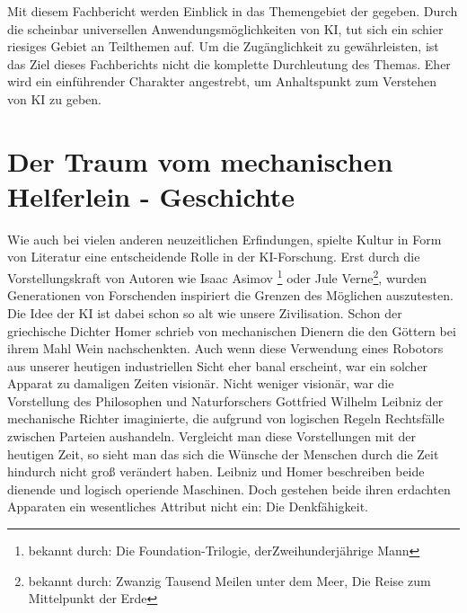 \documentclass[12pt,german,ngerman]{report}
\begin{document}
    Mit diesem Fachbericht werden Einblick in das Themengebiet der  gegeben.
    Durch die scheinbar universellen Anwendungsmöglichkeiten von KI, tut sich ein schier riesiges Gebiet an Teilthemen auf.
    Um die Zugänglichkeit zu gewährleisten, ist das Ziel dieses Fachberichts nicht die komplette Durchleutung
    des Themas. Eher wird ein einführender Charakter angestrebt, um Anhaltspunkt zum Verstehen von KI zu geben.
    

\chapter{Der Traum vom mechanischen Helferlein - Geschichte}

    Wie auch bei vielen anderen neuzeitlichen Erfindungen, spielte Kultur in Form von Literatur eine entscheidende Rolle
    in der KI-Forschung. Erst durch die Vorstellungskraft von Autoren wie Isaac Asimov
    \footnote{bekannt durch: Die Foundation-Trilogie, derZweihunderjährige Mann}
    oder Jule Verne\footnote{bekannt durch: Zwanzig Tausend Meilen unter dem Meer, Die Reise zum Mittelpunkt der Erde}, 
    wurden Generationen von Forschenden inspiriert die Grenzen des Möglichen auszutesten. 
    Die Idee der KI ist dabei schon so alt wie unsere Zivilisation. 
    Schon der griechische Dichter Homer schrieb von mechanischen Dienern die den Göttern bei ihrem Mahl
    Wein nachschenkten\cite[53]{buchanan2005very}. Auch wenn diese Verwendung eines Robotors aus unserer heutigen
    industriellen Sicht eher banal erscheint, war ein solcher Apparat zu damaligen Zeiten visionär.
    Nicht weniger visionär, war die Vorstellung des Philosophen und Naturforschers Gottfried Wilhelm Leibniz der mechanische
    Richter imaginierte, die aufgrund von logischen Regeln Rechtsfälle zwischen Parteien aushandeln\cite[53]{buchanan2005very}.
    Vergleicht man diese Vorstellungen mit der heutigen Zeit, so sieht man das sich die Wünsche der Menschen durch die Zeit hindurch
    nicht groß verändert haben. Leibniz und Homer beschreiben beide dienende und logisch operiende Maschinen.
    Doch gestehen beide ihren erdachten Apparaten ein wesentliches Attribut nicht ein: Die Denkfähigkeit. 
\end{document}
